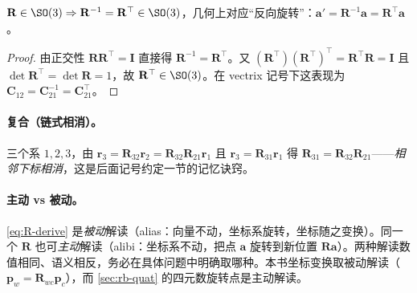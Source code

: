 \begin{proposition}[旋转矩阵的逆是其转置]\label{prop:R-inv}
$\mathbf{R}\in\SO(3)\Rightarrow\mathbf{R}^{-1}=\mathbf{R}^\top\in\SO(3)$，几何上对应“反向旋转”：$\mathbf{a}'=\mathbf{R}^{-1}\mathbf{a}=\mathbf{R}^\top\mathbf{a}$。
\end{proposition}
\begin{proof}
由正交性 $\mathbf{R}\mathbf{R}^\top=\mathbf{I}$ 直接得 $\mathbf{R}^{-1}=\mathbf{R}^\top$。又 $(\mathbf{R}^\top)(\mathbf{R}^\top)^\top=\mathbf{R}^\top\mathbf{R}=\mathbf{I}$ 且 $\det\mathbf{R}^\top=\det\mathbf{R}=1$，故 $\mathbf{R}^\top\in\SO(3)$。在 vectrix 记号下这表现为 $\mathbf{C}_{12}=\mathbf{C}_{21}^{-1}=\mathbf{C}_{21}^\top$\cite{barfoot2024state}。
\end{proof}

\paragraph{复合（链式相消）。}三个系 $1,2,3$，由 $\mathbf{r}_3=\mathbf{R}_{32}\mathbf{r}_2=\mathbf{R}_{32}\mathbf{R}_{21}\mathbf{r}_1$ 且 $\mathbf{r}_3=\mathbf{R}_{31}\mathbf{r}_1$ 得 $\mathbf{R}_{31}=\mathbf{R}_{32}\mathbf{R}_{21}$——\emph{相邻下标相消}，这是后面记号约定一节的记忆诀窍。

\paragraph{主动 vs 被动。}\cref{eq:R-derive} 是\emph{被动}解读（alias：向量不动，坐标系旋转，坐标随之变换）。同一个 $\mathbf{R}$ 也可\emph{主动}解读（alibi：坐标系不动，把点 $\mathbf{a}$ 旋转到新位置 $\mathbf{R}\mathbf{a}$）。两种解读数值相同、语义相反，务必在具体问题中明确取哪种。本书坐标变换取被动解读（$\mathbf{p}_w=\mathbf{R}_{wc}\mathbf{p}_c$），而 \cref{sec:rb-quat} 的四元数旋转点是主动解读。

